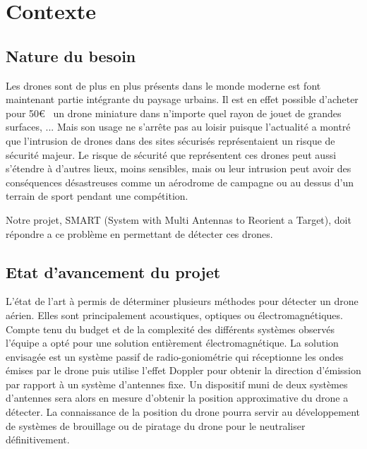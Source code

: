 
\chapter{Contexte}

\section{Nature du besoin}

Les drones sont de plus en plus présents dans le monde moderne est font maintenant partie intégrante du paysage urbains. Il est en effet possible d'acheter pour 50\euro~  un drone miniature dans n'importe quel rayon de jouet de grandes surfaces, ... %
Mais son usage ne s'arrête pas au loisir puisque l'actualité a montré que l'intrusion de drones dans des sites sécurisés représentaient un risque de sécurité majeur. Le risque de sécurité que représentent ces drones peut aussi s'étendre à d'autres lieux, moins sensibles, mais ou leur intrusion peut avoir des conséquences désastreuses comme un aérodrome de campagne ou au dessus d'un terrain de sport pendant une compétition.


Notre projet, SMART (System with Multi Antennas to Reorient a Target), doit répondre a ce problème en permettant de détecter ces drones.  

\section{Etat d'avancement du projet}


L'état de l'art à permis de déterminer plusieurs méthodes pour détecter un drone aérien. Elles sont principalement acoustiques, optiques ou électromagnétiques. Compte tenu du budget et de la complexité des différents systèmes observés l'équipe a opté pour une solution entièrement électromagnétique. La solution envisagée est un système passif de radio-goniométrie qui réceptionne les ondes émises par le drone puis utilise l'effet Doppler pour obtenir la direction d'émission par rapport à un système d'antennes fixe. Un dispositif muni de deux systèmes d'antennes sera alors en mesure d'obtenir la position approximative du drone a détecter. 
La connaissance de la position du drone pourra servir au développement de systèmes de brouillage ou de piratage du drone pour le neutraliser définitivement.


